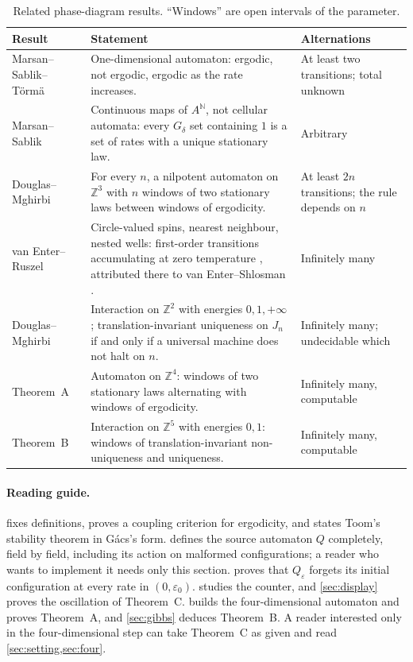 \documentclass[11pt]{article}
\theoremstyle{plain}
\theoremstyle{definition}
\theoremstyle{remark}
\newcommand{\Z}{\mathbb Z}
\newcommand{\N}{\mathbb N}
\newcommand{\eps}{\varepsilon}
\begin{document}
\begin{table}[t]
\centering\small
\begin{tabularx}{\textwidth}{@{}>{\raggedright\arraybackslash}p{} >{\raggedright\arraybackslash}X >{\raggedright\arraybackslash}p{}@{}}
\toprule
Result & Statement & Alternations\\
\midrule
Marsan--Sablik--T\"orm\"a \cite{MST26} & One-dimensional automaton: ergodic, not ergodic, ergodic as the rate increases. & At least two transitions; total unknown\\[4pt]
Marsan--Sablik \cite{MS25} & Continuous maps of $A^{\N}$, not cellular automata: every $G_\delta$ set containing $1$ is a set of rates with a unique stationary law. & Arbitrary\\[4pt]
Douglas--Mghirbi \cite{DMnil} & For every $n$, a nilpotent automaton on $\Z^3$ with $n$ windows of two stationary laws between windows of ergodicity. & At least $2n$ transitions; the rule depends on $n$\\[4pt]
van Enter--Ruszel \cite{vER07} & Circle-valued spins, nearest neighbour, nested wells: first-order transitions accumulating at zero temperature \cite[Section~2]{vER07}, attributed there to van Enter--Shlosman \cite{vES05}. & Infinitely many\\[4pt]
Douglas--Mghirbi \cite{DMhard} & Interaction on $\Z^2$ with energies $0,1,+\infty$; translation-invariant uniqueness on $J_n$ if and only if a universal machine does not halt on $n$. & Infinitely many; undecidable which\\[4pt]
Theorem~A & Automaton on $\Z^4$: windows of two stationary laws alternating with windows of ergodicity. & Infinitely many, computable\\[4pt]
Theorem~B & Interaction on $\Z^5$ with energies $0,1$: windows of translation-invariant non-uniqueness and uniqueness. & Infinitely many, computable\\
\bottomrule
\end{tabularx}
\caption{Related phase-diagram results. ``Windows'' are open intervals of the parameter.}
\label{tab:landscape}
\end{table}

\paragraph{Reading guide.}  fixes definitions, proves a coupling criterion for ergodicity, and states Toom's stability theorem in G\'acs's form.  defines the source automaton $Q$ completely, field by field, including its action on malformed configurations; a reader who wants to implement it needs only this section.  proves that $Q_\eps$ forgets its initial configuration at every rate in $(0,\eps_0)$.  studies the counter, and \cref{sec:display} proves the oscillation of Theorem~C.  builds the four-dimensional automaton and proves Theorem~A, and \cref{sec:gibbs} deduces Theorem~B. A reader interested only in the four-dimensional step can take Theorem~C as given and read \cref{sec:setting,sec:four}.
\end{document}
